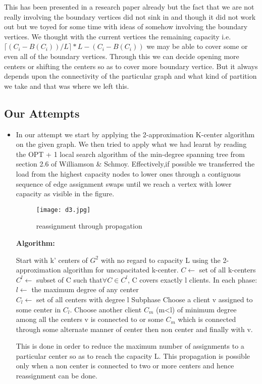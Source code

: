 \documentclass[12pt,a4paper,onecolumn]{article}
\begin{document}
 This has been presented in a research paper already but the fact that we are not really involving the boundary vertices did not sink in and though it did not work out but we toyed for some time with ideas of somehow involving the boundary vertices. We thought with the current vertices the remaining capacity i.e. $\lceil (C_i-B(C_i))/L\rceil*L-(C_i-B(C_i))$ we may be able to cover some or even all of the boundary vertices. Through this we can decide opening more centers or shifting the centers so as to cover more boundary vertice. But it always depends upon the connectivity of the particular graph and what kind of partition we take and that was where we left this.
\subsection{Our Attempts}
\begin{itemize}
\item In our attempt we start by applying the 2-approximation K-center algorithm on the given graph. We then tried to apply what we had learnt by reading the OPT + 1 local search algorithm of the min-degree spanning tree from section 2.6 of Williamson \& Schmoy. Effectively,if possible we transferred the load from the highest capacity nodes to lower ones through a contiguous sequence of edge assignment swaps until we reach a vertex with lower capacity as visible in the figure. \\
\begin{figure}[H]
\begin{center}
\texttt{[image: d3.jpg]}
  \caption{reassignment through propagation}
  \label{Figure 13}
\end{center}
\end{figure}
\textbf{Algorithm:}
\begin{algorithmic}[1]
\STATE Start with k' centers of $G^2$ with no regard to capacity L using the 2-approximation algorithm for uncapacitated k-center.
\STATE $C \leftarrow$ set of all k-centers
\STATE $C^l \leftarrow$ subset of C such that$\forall C \in C^l$, C covers exactly l clients.
\STATE In each phase:\\
\STATE \hspace{1cm}$l \leftarrow$ the maximum degree of any center\\
\STATE \hspace{1cm}$C_l \leftarrow$ set of all centers with degree l
\STATE Subphase
\STATE Choose a client v assigned to some center in $C_l$.
\STATE Choose another client $C_m$ (m<l) of minimum degree among all the centers v is connected to or some $C_m$ which is connected through some alternate manner of center then non center and finally with v.
\ENDWHILE
\end{algorithmic}
This is done in order to reduce the maximum number of assignments to a particular center so as to reach the capacity L. This propagation is possible only when a non center is connected to two or more centers and hence reassignment can be done.


\end{itemize}
\end{document}
